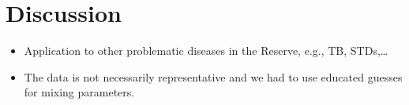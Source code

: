 \documentclass[
  letterpaper,
  abstract]{scrartcl}
\begin{document}
\section{Discussion}\label{discussion}


\begin{itemize}
  \item 
    Application to other problematic diseases in the Reserve, e.g., TB, STDs,\ldots 
  \item
    The data is not necessarily representative and we had to use educated guesses
    for mixing parameters.
\end{itemize}


\printbibliography[title=References]
\end{document}

